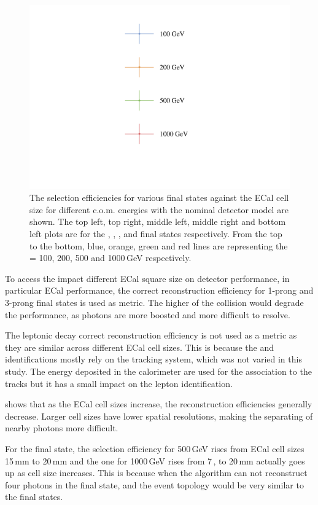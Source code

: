 \begin{figure}[htbp]
\qquad
\includegraphics[width=.45\textwidth]{tau/legend}
\caption[]%
{The selection efficiencies for various final states against the ECal cell size for different c.o.m. energies with the nominal \CLICILD detector model are shown. The top left, top right, middle left, middle right and bottom left plots are for the \decayPion, \decayRho,  \decayAiPhoton, \decayAiPion  and \decayThreePionPhoton  final states respectively. From the top to the bottom, blue, orange, green and red lines are representing the \sqrtS = 100, 200, 500 and 1000\,GeV respectively.}
\label{fig:TauPionEfficiency}
\end{figure}

To access the impact different ECal square size on detector performance, in particular ECal performance, the correct reconstruction efficiency for 1-prong and 3-prong final states is used as metric. The higher \sqrtS of the collision would degrade the performance, as photons are more boosted and more difficult to resolve.

The leptonic decay  correct reconstruction efficiency is not used as a metric as they are similar across different ECal cell sizes. This is because the \Pepm and \Pgmpm identifications mostly rely on the tracking system, which was not varied in this study. The energy deposited in the calorimeter are used for the association to the tracks but it has a small impact on the lepton identification.

 shows that as the ECal cell sizes increase, the reconstruction efficiencies generally decrease. Larger cell sizes have lower spatial resolutions, making the separating of nearby photons more difficult.

For the \decayAiPhoton final state, the selection efficiency for 500\,GeV rises from ECal cell sizes 15\,mm to 20\,mm and the one for 1000\,GeV rises from 7\,, to 20\,mm actually goes up as cell size increases. This is because when the algorithm can not reconstruct four photons in the \decayAiPhoton final state, and the event topology would be very similar to the \decayRho final states.

